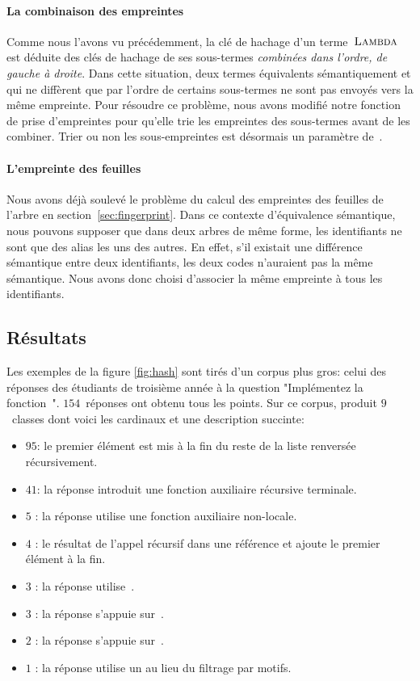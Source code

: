 \paragraph{La combinaison des empreintes}
Comme nous l'avons vu précédemment, la clé de hachage d'un
terme~$\textsc{Lambda}$ est déduite des clés de hachage de ses sous-termes
\textit{combinées dans l'ordre, de gauche à droite}. Dans cette
situation, deux termes équivalents sémantiquement et qui ne diffèrent
que par l'ordre de certains sous-termes ne sont pas envoyés vers la
même empreinte. Pour résoudre ce problème, nous avons modifié notre
fonction de prise d'empreintes pour qu'elle trie les empreintes des
sous-termes avant de les combiner. Trier ou non les sous-empreintes
est désormais un paramètre de~{\Asak}.

\paragraph{L'empreinte des feuilles}
Nous avons déjà soulevé le problème du calcul des empreintes des
feuilles de l'arbre en section~\ref{sec:fingerprint}. Dans ce contexte
d'équivalence sémantique, nous pouvons supposer que dans deux arbres
de même forme, les identifiants ne sont que des alias les uns des
autres. En effet, s'il existait une différence sémantique entre deux
identifiants, les deux codes n'auraient pas la même sémantique.  Nous
avons donc choisi d'associer la même empreinte à tous les
identifiants. 

\subsection{Résultats}

Les exemples de la figure \ref{fig:hash} sont tirés d'un corpus plus
gros: celui des réponses des étudiants de troisième année à la
question "Implémentez la fonction~". $154$~réponses ont
obtenu tous les points. Sur ce corpus, {\Asak} produit $9$~classes
dont voici les cardinaux et une description succinte:

\begin{itemize}
\item $95$: le premier élément est mis à la fin du reste de la liste renversée récursivement.
\item $41$: la réponse introduit une fonction auxiliaire récursive terminale.
\item $5$ : la réponse utilise une fonction auxiliaire non-locale.
\item $4$ : le résultat de l'appel récursif dans une référence et ajoute le premier élément à la fin.
\item $3$ : la réponse utilise~.
\item $3$ : la réponse s'appuie sur~.
\item $2$ : la réponse s'appuie sur~.
\item $1$ : la réponse utilise un  au lieu du filtrage par motifs.
\end{itemize}

